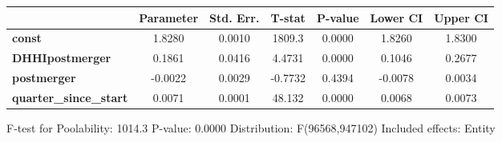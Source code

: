 \documentclass{report}
\begin{document}
\begin{center}
\begin{tabular}{lcccccc}
                               & \textbf{Parameter} & \textbf{Std. Err.} & \textbf{T-stat} & \textbf{P-value} & \textbf{Lower CI} & \textbf{Upper CI}  \\
\midrule
\textbf{const}                 &       1.8280       &       0.0010       &      1809.3     &      0.0000      &       1.8260      &       1.8300       \\
\textbf{DHHIpostmerger}        &       0.1861       &       0.0416       &      4.4731     &      0.0000      &       0.1046      &       0.2677       \\
\textbf{postmerger}            &      -0.0022       &       0.0029       &     -0.7732     &      0.4394      &      -0.0078      &       0.0034       \\
\textbf{quarter\_since\_start} &       0.0071       &       0.0001       &      48.132     &      0.0000      &       0.0068      &       0.0073       \\
\bottomrule
\end{tabular}
\end{center}

F-test for Poolability: 1014.3 \newline
 P-value: 0.0000 \newline
 Distribution: F(96568,947102) \newline
  \newline
 Included effects: Entity
\end{document}
